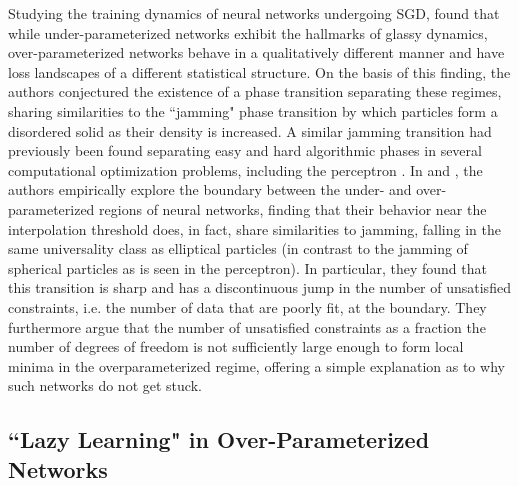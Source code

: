 \documentclass[a4paper, 12pt]{article}
\begin{document}
Studying the training dynamics of neural networks undergoing SGD, \cite{baity-jesiComparingDynamicsDeep2019} found that while under-parameterized networks exhibit the hallmarks of glassy dynamics, over-parameterized networks behave in a qualitatively different manner and have loss landscapes of a different statistical structure. On the basis of this finding, the authors conjectured the existence of a phase transition separating these regimes, sharing similarities to the ``jamming" phase transition by which particles form a disordered solid as their density is increased. A similar jamming transition had previously been found separating easy and hard algorithmic phases in several computational optimization problems, including the perceptron \cite{krzakalaLandscapeAnalysisConstraint2007,zdeborovaPhaseTransitionsColoring2007,franzUniversalitySATUNSATJamming2017}. In \cite{geigerJammingTransitionParadigm2019} and \cite{spiglerJammingTransitionOverparametrization2019}, the authors empirically explore the boundary between the under- and over-parameterized regions of neural networks, finding that their behavior near the interpolation threshold does, in fact, share similarities to jamming, falling in the same universality class as elliptical particles (in contrast to the jamming of spherical particles as is seen in the perceptron). In particular, they found that this transition is sharp and has a discontinuous jump in the number of unsatisfied constraints, i.e. the number of data that are poorly fit, at the boundary. They furthermore argue that the number of unsatisfied constraints as a fraction the number of degrees of freedom is not sufficiently large enough to form local minima in the overparameterized regime, offering a simple explanation as to why such networks do not get stuck.

\subsection{``Lazy Learning" in Over-Parameterized Networks}
\end{document}
